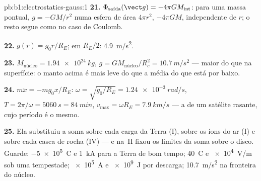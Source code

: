 \begin{solution}{pb:b1:electrostatics-gauss:1}
\textbf{21.} $\Phi_{\text{saída}}(\vect g) = -4\pi GM_{\text{int}}$: para uma massa pontual,
$g = -GM/r^2$ numa esfera de área $4\pi r^2$,  $-4\pi GM$, independente
de $r$; o resto segue como no caso de Coulomb.

\textbf{22.} $g(r) = g_0r/R_E$; em $R_E/2$: \qty{4.9}{m/s^2}.

\textbf{23.} $M_{\text{núcleo}} = \qty{1.94e24}{kg}$, $g = GM_{\text{núcleo}}/R_c^2 =
\qty{10.7}{m/s^2}$ --- maior do que na superfície: o manto acima é
mais leve do que a média do que está por baixo.

\textbf{24.} $m\ddot x = -mg_0x/R_E$: $\omega = \sqrt{g_0/R_E} = \qty{1.24e-3}{rad/s}$,
$T = 2\pi/\omega = \qty{5060}{s} = \qty{84}{min}$, $v_{\max} = \omega R_E =
\qty{7.9}{km/s}$ --- a  de um satélite rasante, cujo
período é o mesmo.

\textbf{25.} Ela substituiu a soma sobre cada carga da Terra (I),
sobre os íons do ar (I) e sobre cada casca de rocha (IV) --- e
na~II fixou os limites da soma sobre o disco. Guarde: \qty{-5e5}{C} e
\qty{1}{kA} para a Terra de bom tempo; \qty{40}{C} e \qty{e4}{V/m} sob uma
tempestade; \qty{e5}{A} e \qty{e9}{J} por descarga; \qty{10.7}{m/s^2} na fronteira
do núcleo.
\end{solution}

